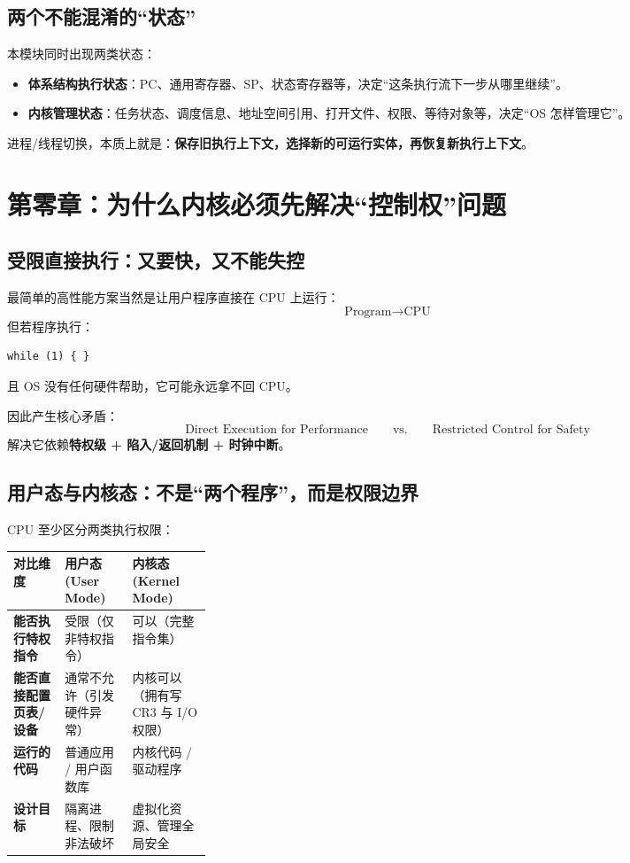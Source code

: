 \documentclass[11pt,a4paper]{ctexart}
\newcommand{\kw}[1]{\textbf{#1}}
\begin{document}
\subsection{两个不能混淆的“状态”}

本模块同时出现两类状态：

\begin{itemize}
  \item \kw{体系结构执行状态}：PC、通用寄存器、SP、状态寄存器等，决定“这条执行流下一步从哪里继续”。
  \item \kw{内核管理状态}：任务状态、调度信息、地址空间引用、打开文件、权限、等待对象等，决定“OS 怎样管理它”。
\end{itemize}

进程/线程切换，本质上就是：\kw{保存旧执行上下文，选择新的可运行实体，再恢复新执行上下文}。

\section{第零章：为什么内核必须先解决“控制权”问题}

\subsection{受限直接执行：又要快，又不能失控}

最简单的高性能方案当然是让用户程序直接在 CPU 上运行：
\[
\text{Program}\rightarrow\text{CPU}
\]
但若程序执行：
\begin{verbatim}
while (1) { }
\end{verbatim}
且 OS 没有任何硬件帮助，它可能永远拿不回 CPU。

因此产生核心矛盾：
\[
\boxed{\text{Direct Execution for Performance}}
\qquad\text{vs.}\qquad
\boxed{\text{Restricted Control for Safety}}
\]
解决它依赖\kw{特权级 + 陷入/返回机制 + 时钟中断}。

\subsection{用户态与内核态：不是“两个程序”，而是权限边界}

CPU 至少区分两类执行权限：

\begingroup
\small
\renewcommand{\arraystretch}{1.25}
\setlength{\tabcolsep}{6pt}
\begin{tabularx}{\linewidth}{>{\bfseries}p{0.26\linewidth} X X}
\toprule
对比维度 & 用户态 (User Mode) & 内核态 (Kernel Mode)\\
\midrule
能否执行特权指令 & 受限（仅非特权指令） & 可以（完整指令集）\\
能否直接配置页表/设备 & 通常不允许（引发硬件异常） & 内核可以（拥有写 CR3 与 I/O 权限）\\
运行的代码 & 普通应用 / 用户函数库 & 内核代码 / 驱动程序\\
设计目标 & 隔离进程、限制非法破坏 & 虚拟化资源、管理全局安全\\
\bottomrule
\end{tabularx}
\endgroup
\end{document}
